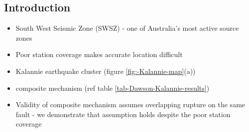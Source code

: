 \documentclass[grl]{agutex}
\begin{document}

\begin{abstract}
(Type abstract here)
\end{abstract}

%
%

%

\begin{article}

%
%

\section{Introduction}
\begin{itemize}
\item South West Seismic Zone (SWSZ) - one of Australia's most active source zones
\item Poor station coverage makes accurate location difficult
\item Kalannie earthquake cluster (figure \ref{fig:-Kalannie-map}(a))
\item \citet{dr_Dawson08a} composite mechanism (ref table \ref{tab-Dawson-Kalannie-results})
\item Validity of composite mechanism assumes overlapping rupture on the same fault - we demonstrate that
assumption holds despite the poor station coverage
\end{itemize}


\end{article}
\end{document}
